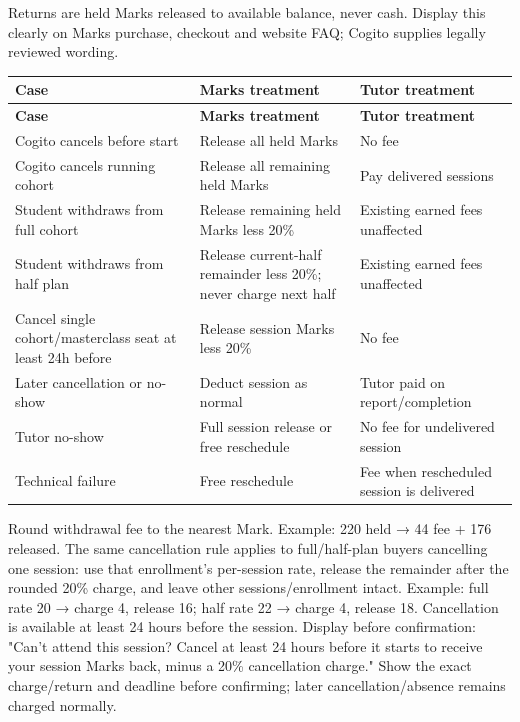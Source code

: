 \documentclass[11pt,a4paper]{article}
\begin{document}
Returns are held Marks released to available balance, never cash. Display this clearly on Marks purchase, checkout and website FAQ; Cogito supplies legally reviewed wording.

{\small
\begin{longtable}{|L{28.54mm}|L{52.57mm}|L{69.09mm}|}
\hline
\textbf{Case} & \textbf{Marks treatment} & \textbf{Tutor treatment} \\ \hline
\endfirsthead
\hline
\textbf{Case} & \textbf{Marks treatment} & \textbf{Tutor treatment} \\ \hline
\endhead
Cogito cancels before start & Release all held Marks & No fee \\ \hline
Cogito cancels running cohort & Release all remaining held Marks & Pay delivered sessions \\ \hline
Student withdraws from full cohort & Release remaining held Marks less 20\% & Existing earned fees unaffected \\ \hline
Student withdraws from half plan & Release current-half remainder less 20\%; never charge next half & Existing earned fees unaffected \\ \hline
Cancel single cohort/\allowbreak{}masterclass seat at least 24h before & Release session Marks less 20\% & No fee \\ \hline
Later cancellation or no-show & Deduct session as normal & Tutor paid on report/\allowbreak{}completion \\ \hline
Tutor no-show & Full session release or free reschedule & No fee for undelivered session \\ \hline
Technical failure & Free reschedule & Fee when rescheduled session is delivered \\ \hline
\end{longtable}
}

Round withdrawal fee to the nearest Mark. Example: 220 held → 44 fee + 176 released. The same cancellation rule applies to full/\allowbreak{}half-plan buyers cancelling one session: use that enrollment's per-session rate, release the remainder after the rounded 20\% charge, and leave other sessions/\allowbreak{}enrollment intact. Example: full rate 20 → charge 4, release 16; half rate 22 → charge 4, release 18. Cancellation is available at least 24 hours before the session. Display before confirmation: "Can't attend this session? Cancel at least 24 hours before it starts to receive your session Marks back, minus a 20\% cancellation charge." Show the exact charge/\allowbreak{}return and deadline before confirming; later cancellation/\allowbreak{}absence remains charged normally.
\end{document}

